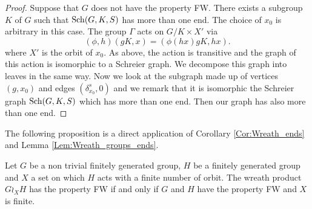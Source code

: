 \begin{lem}
\begin{proof}
Suppose that $G$ does not have the property FW. There exists a subgroup $K$ of $G$ such that $\operatorname{Sch}(G,K,S)$ has more than one end. The choice of $x_0$ is arbitrary in this case. The group $\Gamma$ acts on $G/K \times X'$ via  
\begin{equation*}
(\phi,h)(gK,x) = (\phi(hx) gK, hx).
\end{equation*}
where $X'$ is the orbit of $x_0$. As above, the action is transitive and the graph of this action is isomorphic to a Schreier graph. We decompose this graph into leaves in the same way. Now we look at the subgraph made up of vertices $(g,x_0)$ and edges $(\delta_{x_0}^s,0)$ and we remark that it is isomorphic the Schreier graph $\operatorname{Sch}(G,K,S)$ which has more than one end. Then our graph has also more than one end.
\end{proof}
\end{lem}
%
%
The following proposition is a direct application of Corollary \ref{Cor:Wreath_ends} and Lemma \ref{Lem:Wreath_groups_ends}.
%
%
\begin{prop}
Let $G$ be a non trivial finitely generated group, $H$ be a finitely generated group and $X$ a set on which $H$ acts with a finite number of orbit. The wreath product $G \wr_X H$ has the property FW if and only if $G$ and $H$ have the property FW and $X$ is finite.
\end{prop}
%
%
